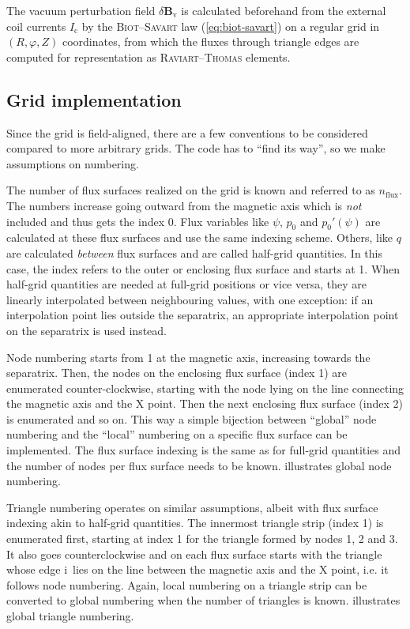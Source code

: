 \documentclass[a4paper, twoside, 10pt, english]{article}
\numberwithin{equation}{section}
\let\temp\varrho
\let\varrho\rho
\let\rho\temp
\let\temp\vartheta
\let\vartheta\theta
\let\theta\temp
\let\temp\varphi
\let\varphi\phi
\let\phi\temp
\let\vec\symbf
\newcommand*\Bvac{\ensuremath{\delta \vec{B}_{\text{v}}}}  %
\newcommand*\inw{\ensuremath{\textrm{i}}}  %
\newcommand*\nflux{\ensuremath{n_{\text{flux}}}}  %
\begin{document}
The vacuum perturbation field $\Bvac$ is calculated beforehand from the external coil currents $I_{\text{c}}$ by the \textsc{Biot}--\textsc{Savart} law (\cref{eq:biot-savart}) on a regular grid in $(R, \phi, Z)$ coordinates, from which the fluxes through triangle edges are computed for representation as \textsc{Raviart}--\textsc{Thomas} elements.

\subsection{Grid implementation}
\label{sec:grid-impl}

Since the grid is field-aligned, there are a few conventions to be considered compared to more arbitrary grids. The code has to \enquote{find its way}, so we make assumptions on numbering.

The number of flux surfaces realized on the grid is known and referred to as \nflux. The numbers increase going outward from the magnetic axis which is \emph{not} included and thus gets the index 0. Flux variables like $\psi$, $p_{0}$ and $p_{0}' (\psi)$ are calculated at these flux surfaces and use the same indexing scheme. Others, like $q$ are calculated \emph{between} flux surfaces and are called half-grid quantities. In this case, the index refers to the outer or enclosing flux surface and starts at 1. When half-grid quantities are needed at full-grid positions or vice versa, they are linearly interpolated between neighbouring values, with one exception: if an interpolation point lies outside the separatrix, an appropriate interpolation point on the separatrix is used instead.

Node numbering starts from 1 at the magnetic axis, increasing towards the separatrix. Then, the nodes on the enclosing flux surface (index 1) are enumerated counter-clockwise, starting with the node lying on the line connecting the magnetic axis and the X point. Then the next enclosing flux surface (index 2) is enumerated and so on. This way a simple bijection between \enquote{global} node numbering and the \enquote{local} numbering on a specific flux surface can be implemented. The flux surface indexing is the same as for full-grid quantities and the number of nodes per flux surface needs to be known.  illustrates global node numbering.

Triangle numbering operates on similar assumptions, albeit with flux surface indexing akin to half-grid quantities. The innermost triangle strip (index 1) is enumerated first, starting at index 1 for the triangle formed by nodes 1, 2 and 3. It also goes counterclockwise and on each flux surface starts with the triangle whose edge \inw\ lies on the line between the magnetic axis and the X point, i.e. it follows node numbering. Again, local numbering on a triangle strip can be converted to global numbering when the number of triangles is known.  illustrates global triangle numbering.
\end{document}
